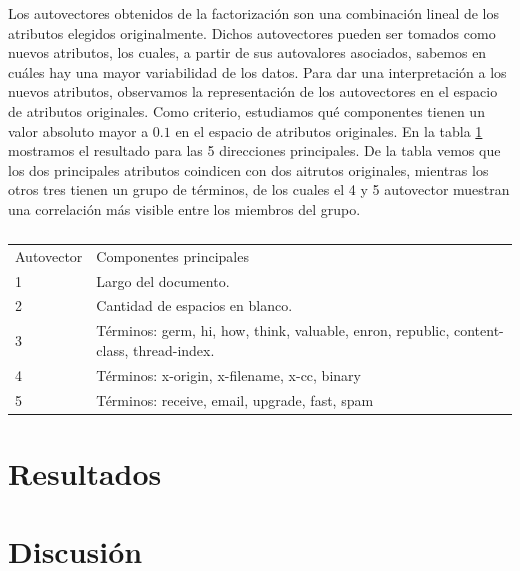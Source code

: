 \documentclass[a4paper,10pt]{article}
\begin{document}
\par Los autovectores obtenidos de la factorización son una combinación lineal de los atributos elegidos originalmente. Dichos autovectores pueden ser tomados como nuevos atributos, los cuales, a partir de sus autovalores asociados, sabemos en cuáles hay una mayor variabilidad de los datos. Para dar una interpretación a los nuevos atributos, observamos la representación de los autovectores en el espacio de atributos originales. Como criterio, estudiamos qué componentes tienen un valor absoluto mayor a $0.1$ en el espacio de atributos originales. En la tabla \ref{table:autovectores} mostramos el resultado para las 5 direcciones principales. De la tabla vemos que los dos principales atributos coindicen con dos aitrutos originales, mientras los otros tres tienen un grupo de términos, de los cuales el 4 y 5 autovector muestran una correlación más visible entre los miembros del grupo.
\begin{table}
\centering
\caption{}
\label{table:autovectores}
\begin{tabular}{ll}
Autovector & Componentes principales \\
1 & Largo del documento. \\
2 & Cantidad de espacios en blanco. \\
3 & Términos: germ, hi, how, think, valuable, enron, republic, content-class, thread-index. \\
4 & Términos: x-origin, x-filename, x-cc, binary \\
5 & Términos: receive, email, upgrade, fast, spam \\
\end{tabular}
\end{table}


\section{Resultados}

\section{Discusi\'on}


\scriptsize


\end{document}
